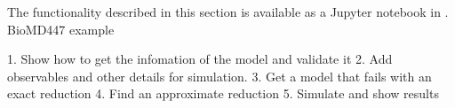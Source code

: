 The functionality described in this section is available as a Jupyter notebook in \RepoURL.
BioMD447 example

1. Show how to get the infomation of the model and validate it
2. Add observables and other details for simulation.
3. Get a model that fails with an exact reduction  
4. Find an approximate reduction 
5. Simulate and show results

